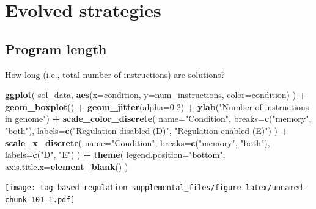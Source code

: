 \documentclass[]{book}
\newenvironment{Shaded}{\begin{snugshade}}{\end{snugshade}}
\newcommand{\DataTypeTok}[1]{\textcolor[rgb]{0.13,0.29,0.53}{#1}}
\newcommand{\FloatTok}[1]{\textcolor[rgb]{0.00,0.00,0.81}{#1}}
\newcommand{\KeywordTok}[1]{\textcolor[rgb]{0.13,0.29,0.53}{\textbf{#1}}}
\newcommand{\NormalTok}[1]{#1}
\newcommand{\OperatorTok}[1]{\textcolor[rgb]{0.81,0.36,0.00}{\textbf{#1}}}
\newcommand{\StringTok}[1]{\textcolor[rgb]{0.31,0.60,0.02}{#1}}
\begin{document}
\hypertarget{evolved-strategies-2}{%
\section{Evolved strategies}\label{evolved-strategies-2}}

\hypertarget{program-length-3}{%
\subsection{Program length}\label{program-length-3}}

How long (i.e., total number of instructions) are solutions?

\begin{Shaded}
\begin{Highlighting}[]
\KeywordTok{ggplot}\NormalTok{( sol_data, }\KeywordTok{aes}\NormalTok{(}\DataTypeTok{x=}\NormalTok{condition, }\DataTypeTok{y=}\NormalTok{num_instructions, }\DataTypeTok{color=}\NormalTok{condition) ) }\OperatorTok{+}
\StringTok{  }\KeywordTok{geom_boxplot}\NormalTok{() }\OperatorTok{+}
\StringTok{  }\KeywordTok{geom_jitter}\NormalTok{(}\DataTypeTok{alpha=}\FloatTok{0.2}\NormalTok{) }\OperatorTok{+}
\StringTok{  }\KeywordTok{ylab}\NormalTok{(}\StringTok{"Number of instructions in genome"}\NormalTok{) }\OperatorTok{+}
\StringTok{  }\KeywordTok{scale_color_discrete}\NormalTok{(}
    \DataTypeTok{name=}\StringTok{"Condition"}\NormalTok{,}
    \DataTypeTok{breaks=}\KeywordTok{c}\NormalTok{(}\StringTok{"memory"}\NormalTok{, }\StringTok{"both"}\NormalTok{),}
    \DataTypeTok{labels=}\KeywordTok{c}\NormalTok{(}\StringTok{"Regulation-disabled (D)"}\NormalTok{, }\StringTok{"Regulation-enabled (E)"}\NormalTok{)}
\NormalTok{  ) }\OperatorTok{+}
\StringTok{  }\KeywordTok{scale_x_discrete}\NormalTok{(}
    \DataTypeTok{name=}\StringTok{"Condition"}\NormalTok{,}
    \DataTypeTok{breaks=}\KeywordTok{c}\NormalTok{(}\StringTok{"memory"}\NormalTok{, }\StringTok{"both"}\NormalTok{),}
    \DataTypeTok{labels=}\KeywordTok{c}\NormalTok{(}\StringTok{"D"}\NormalTok{, }\StringTok{"E"}\NormalTok{)}
\NormalTok{  ) }\OperatorTok{+}
\StringTok{  }\KeywordTok{theme}\NormalTok{(}
    \DataTypeTok{legend.position=}\StringTok{"bottom"}\NormalTok{,}
    \DataTypeTok{axis.title.x=}\KeywordTok{element_blank}\NormalTok{()}
\NormalTok{  )}
\end{Highlighting}
\end{Shaded}

\texttt{[image: tag-based-regulation-supplemental\_files/figure-latex/unnamed-chunk-101-1.pdf]}
\end{document}
